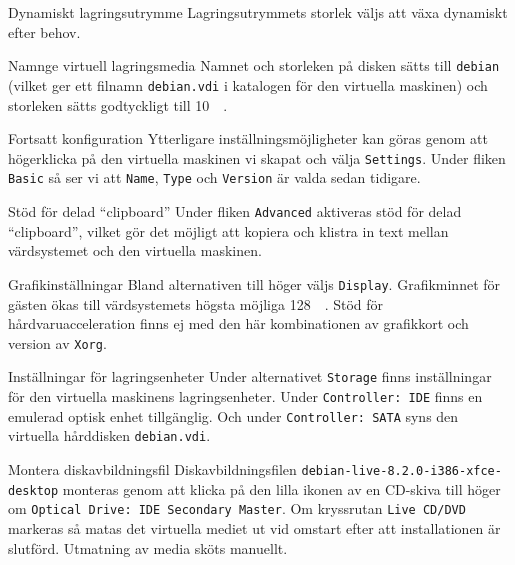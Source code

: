            {Dynamiskt lagringsutrymme}
           {Lagringsutrymmets storlek väljs att växa dynamiskt efter behov.}
           {}

           {Namnge virtuell lagringsmedia}
           {Namnet och storleken på disken sätts till \texttt{debian} (vilket
            ger ett filnamn \texttt{debian.vdi} i katalogen för den virtuella
            maskinen) och storleken sätts godtyckligt till \SI{10}{\M\byte}.}
           {}

           {Fortsatt konfiguration}
           {Ytterligare inställningsmöjligheter kan göras genom att högerklicka
            på den virtuella maskinen vi skapat och välja \texttt{Settings}.
            Under fliken \texttt{Basic} så ser vi att \texttt{Name}, \texttt{Type}
            och \texttt{Version} är valda sedan tidigare.}
           {}

           {Stöd för delad ``clipboard''}
           {Under fliken \texttt{Advanced} aktiveras stöd för delad ``clipboard'',
            vilket gör det möjligt att kopiera och klistra in text mellan
            värdsystemet och den virtuella maskinen.}
           {}

           {Grafikinställningar}
           {Bland alternativen till höger väljs \texttt{Display}.
            Grafikminnet för gästen ökas till värdsystemets högsta möjliga
            \SI{128}{\M\byte}. Stöd för hårdvaruacceleration finns ej med
            den här kombinationen av grafikkort och version av \texttt{Xorg}.}
           {}

           {Inställningar för lagringsenheter}
           {Under alternativet \texttt{Storage} finns inställningar för den
            virtuella maskinens lagringsenheter. Under \texttt{Controller: IDE}
            finns en emulerad optisk enhet tillgänglig.
            Och under \texttt{Controller: SATA} syns den virtuella hårddisken
            \texttt{debian.vdi}.}
           {}

           {Montera diskavbildningsfil}
           {Diskavbildningsfilen \texttt{debian-live-8.2.0-i386-xfce-desktop} monteras
            genom att klicka på den lilla ikonen av en CD-skiva till höger om
            \texttt{Optical Drive: IDE Secondary Master}. Om kryssrutan
            \texttt{Live CD/DVD} markeras så matas det virtuella mediet ut vid omstart
            efter att installationen är slutförd. Utmatning av media sköts manuellt.}
           {}


